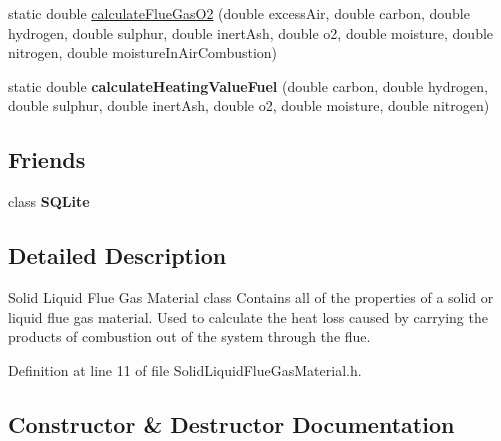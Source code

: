 \begin{DoxyCompactItemize}
\item 
static double \hyperlink{class_solid_liquid_flue_gas_material_a33152fce2511a4db7240461a7de950a5}{calculate\+Flue\+Gas\+O2} (double excess\+Air, double carbon, double hydrogen, double sulphur, double inert\+Ash, double o2, double moisture, double nitrogen, double moisture\+In\+Air\+Combustion)
\item 
\mbox{\label{class_solid_liquid_flue_gas_material_a301ff1dc16086e191638b881a553539d}} 
static double {\bfseries calculate\+Heating\+Value\+Fuel} (double carbon, double hydrogen, double sulphur, double inert\+Ash, double o2, double moisture, double nitrogen)
\end{DoxyCompactItemize}
\subsection*{Friends}
\begin{DoxyCompactItemize}
\item 
\mbox{\label{class_solid_liquid_flue_gas_material_a0102f3b3c0cbf96db6c49f071fa5e7cc}} 
class {\bfseries S\+Q\+Lite}
\end{DoxyCompactItemize}


\subsection{Detailed Description}
Solid Liquid Flue Gas Material class Contains all of the properties of a solid or liquid flue gas material. Used to calculate the heat loss caused by carrying the products of combustion out of the system through the flue. 

Definition at line 11 of file Solid\+Liquid\+Flue\+Gas\+Material.\+h.



\subsection{Constructor \& Destructor Documentation}
\mbox{\label{class_solid_liquid_flue_gas_material_a91e7c5e670b3db4fedcbc494448644d5}} 
